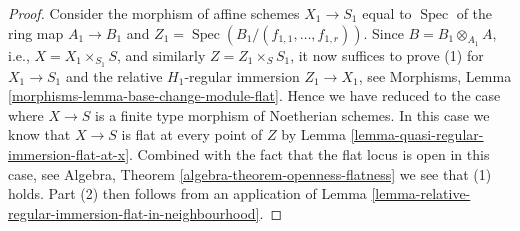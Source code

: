 \documentclass[10pt,a4paper]{amsart}
\theoremstyle{plain}
\theoremstyle{definition}
\theoremstyle{remark}
\numberwithin{equation}{subsection}
\def\Spec{\mathop{\mathrm{Spec}}}
\begin{document}
\begin{proof}
\medskip\noindent
Consider the morphism of affine schemes
$X_1 \to S_1$ equal to $\Spec$ of the
ring map $A_1 \to B_1$ and
$Z_1 = \Spec(B_1/(f_{1, 1}, \ldots, f_{1, r}))$.
Since $B = B_1 \otimes_{A_1} A$, i.e., $X = X_1 \times_{S_1} S$,
and similarly $Z = Z_1 \times_S S_1$,
it now suffices to prove (1) for $X_1 \to S_1$ and the relative
$H_1$-regular immersion $Z_1 \to X_1$, see
Morphisms, Lemma \ref{morphisms-lemma-base-change-module-flat}.
Hence we have reduced to the case where $X \to S$ is a finite type
morphism of Noetherian schemes.
In this case we know that $X \to S$ is flat at every
point of $Z$ by
Lemma \ref{lemma-quasi-regular-immersion-flat-at-x}.
Combined with the fact that the flat locus is open in this case, see
Algebra, Theorem \ref{algebra-theorem-openness-flatness}
we see that (1) holds. Part (2) then follows from an application of
Lemma \ref{lemma-relative-regular-immersion-flat-in-neighbourhood}.
\end{proof}
\end{document}
